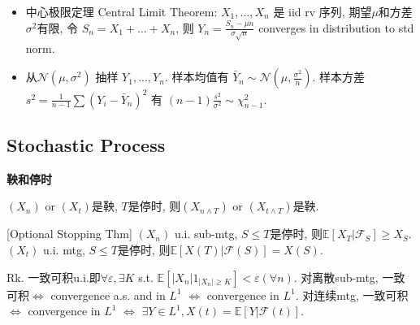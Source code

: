 \documentclass[UTF8]{ctexart}
\begin{document}
\begin{itemize}
\item 中心极限定理 Central Limit Theorem:
	$X_1,\dots,X_n$ 是 iid rv 序列, 期望$\mu$和方差$\sigma^2$有限,
	令 $S_n = X_1+\dots+X_n$, 则 $Y_n=\frac{S_n-\mu n}{\sigma\sqrt{n}}$
	converges in distribution to std norm.

\item 从$\mathcal{N}(\mu,\sigma^2)$ 抽样 $Y_1,...,Y_n$.
	样本均值有 $\bar{Y}_n\sim\mathcal{N}(\mu,\frac{\sigma^2}{n})$.
	样本方差 $s^2=\frac{1}{n-1}\sum(Y_i-\bar{Y}_n)^2$ 有 $(n-1)\frac{s^2}{\sigma^2} \sim \chi_{n-1}^2$.

\end{itemize}

\subsection{Stochastic Process}

\noindent \textbf{鞅和停时}

$(X_n)$ or $(X_t)$是鞅, $T$是停时, 则$(X_{n\wedge T})$ or $(X_{t\wedge T})$是鞅.

[Optional Stopping Thm] $(X_n)$ u.i. sub-mtg, $S\leq T$是停时, 则$\mathbb{E}[X_T|\mathcal{F}_S]\geq X_S$.
$(X_t)$ u.i. mtg, $S\leq T$是停时, 则$\mathbb{E}[X(T)|\mathcal{F}(S)]=X(S)$.

Rk. 一致可积u.i.即$\forall \varepsilon, \exists K$ s.t. $\mathbb{E}[|X_n|1_{|X_n|\geq K}]<\varepsilon (\forall n)$.
对离散sub-mtg, 一致可积$\Leftrightarrow$ convergence a.s. and in $L^1$  $\Leftrightarrow$ convergence in $L^1$.
对连续mtg, 一致可积$\Leftrightarrow$ convergence in $L^1$  $\Leftrightarrow$ $\exists Y\in L^1, X(t)=\mathbb{E}[Y|\mathcal{F}(t)]$.
\end{document}
